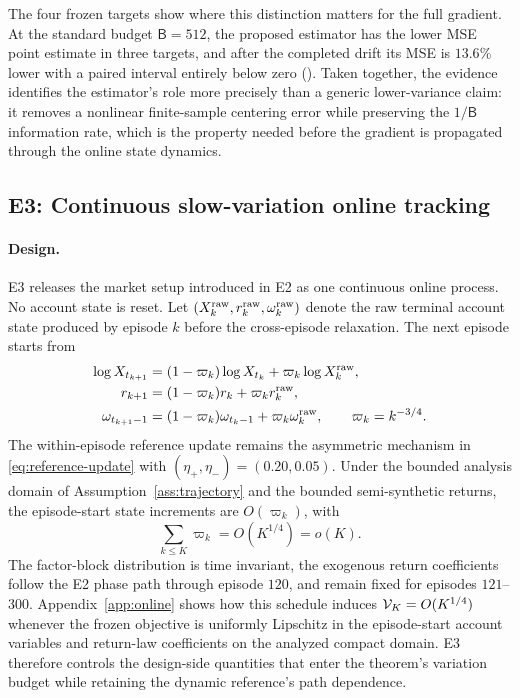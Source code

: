 The four frozen targets show where this distinction matters for the full gradient.  At the standard budget $\mathsf B=512$, the proposed estimator has the lower MSE point estimate in three targets, and after the completed drift its MSE is $13.6\%$ lower with a paired interval entirely below zero ().  Taken together, the evidence identifies the estimator's role more precisely than a generic lower-variance claim: it removes a nonlinear finite-sample centering error while preserving the $1/\mathsf B$ information rate, which is the property needed before the gradient is propagated through the online state dynamics.
\FloatBarrier

\subsection{E3: Continuous slow-variation online tracking}\label{sec:e3}
\paragraph{Design.}
E3 releases the market setup introduced in E2 as one continuous online process.  No account state is reset.  Let $(X_k^{\rm raw},r_k^{\rm raw},\omega_k^{\rm raw})$ denote the raw terminal account state produced by episode $k$ before the cross-episode relaxation.  The next episode starts from
\[
\begin{aligned}
\log X_{t_{k+1}}
&=(1-\varpi_k)\log X_{t_k}+\varpi_k\log X_k^{\rm raw},\\
r_{k+1}
&=(1-\varpi_k)r_k+\varpi_k r_k^{\rm raw},\\
\omega_{t_{k+1}-1}
&=(1-\varpi_k)\omega_{t_k-1}+\varpi_k\omega_k^{\rm raw},
\qquad
\varpi_k=k^{-3/4}.
\end{aligned}
\]
The within-episode reference update remains the asymmetric mechanism in \eqref{eq:reference-update} with $(\eta_+,\eta_-)=(0.20,0.05)$.  Under the bounded analysis domain of Assumption~\ref{ass:trajectory} and the bounded semi-synthetic returns, the episode-start state increments are $O(\varpi_k)$, with
\[
\sum_{k\le K}\varpi_k=O(K^{1/4})=o(K).
\]
The factor-block distribution is time invariant, the exogenous return coefficients follow the E2 phase path through episode $120$, and remain fixed for episodes $121$--$300$.  Appendix~\ref{app:online} shows how this schedule induces $\mathcal V_K=O(K^{1/4})$ whenever the frozen objective is uniformly Lipschitz in the episode-start account variables and return-law coefficients on the analyzed compact domain.  E3 therefore controls the design-side quantities that enter the theorem's variation budget while retaining the dynamic reference's path dependence.

